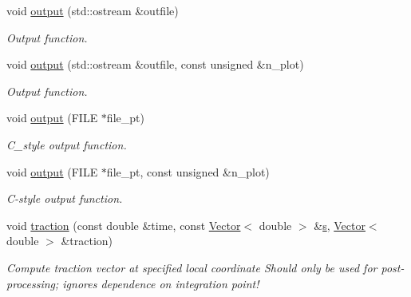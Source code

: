 \begin{DoxyCompactItemize}
void \hyperlink{classoomph_1_1AxisymmetricLinearElasticityTractionElement_a5823855e2697fcf80ab41378d29cff5b}{output} (std\+::ostream \&outfile)
\begin{DoxyCompactList}\small\item\em Output function. \end{DoxyCompactList}\item 
void \hyperlink{classoomph_1_1AxisymmetricLinearElasticityTractionElement_ad2f848b61c90a1c1424ad0480eee4ba0}{output} (std\+::ostream \&outfile, const unsigned \&n\+\_\+plot)
\begin{DoxyCompactList}\small\item\em Output function. \end{DoxyCompactList}\item 
void \hyperlink{classoomph_1_1AxisymmetricLinearElasticityTractionElement_a3d7e3ee90159e221abb5ff860dd27cc6}{output} (F\+I\+LE $\ast$file\+\_\+pt)
\begin{DoxyCompactList}\small\item\em C\+\_\+style output function. \end{DoxyCompactList}\item 
void \hyperlink{classoomph_1_1AxisymmetricLinearElasticityTractionElement_a0c3231cf4b9d70b1b3080f195b1bf813}{output} (F\+I\+LE $\ast$file\+\_\+pt, const unsigned \&n\+\_\+plot)
\begin{DoxyCompactList}\small\item\em C-\/style output function. \end{DoxyCompactList}\item 
void \hyperlink{classoomph_1_1AxisymmetricLinearElasticityTractionElement_a28af87bac3d8d0c935564e69277e215e}{traction} (const double \&time, const \hyperlink{classoomph_1_1Vector}{Vector}$<$ double $>$ \&\hyperlink{cfortran_8h_ab7123126e4885ef647dd9c6e3807a21c}{s}, \hyperlink{classoomph_1_1Vector}{Vector}$<$ double $>$ \&traction)
\begin{DoxyCompactList}\small\item\em Compute traction vector at specified local coordinate Should only be used for post-\/processing; ignores dependence on integration point! \end{DoxyCompactList}\end{DoxyCompactItemize}

